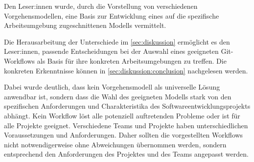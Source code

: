 Den Leser:innen wurde, durch die Vorstellung von verschiedenen Vorgehensmodellen, eine Basis zur Entwicklung eines auf die spezifische Arbeitsumgebung zugeschnittenen Modells vermittelt. 

Die Herausarbeitung der Unterschiede im \autoref{sec:diskussion} ermöglicht es den Leser:innen, passende Entscheidungen bei der Auswahl eines geeigneten Git\hyp Workflows als Basis für ihre konkreten Arbeitsumgebungen zu treffen. Die konkreten Erkenntnisse können in \autoref{sec:diskussion:conclusion} nachgelesen werden.

Dabei wurde deutlich, dass kein Vorgehensmodell als universelle Lösung anwendbar ist, sondern dass die Wahl des geeigneten Modells stark von den spezifischen Anforderungen und Charakteristika des Softwareentwicklungsprojekts abhängt. Kein Workflow löst alle potenziell auftretenden Probleme oder ist für alle Projekte geeignet. Verschiedene Teams und Projekte haben unterschiedlichen Voraussetzungen und Anforderungen. Daher sollten die vorgestellten Workflows nicht notwendigerweise ohne Abweichungen übernommen werden, sondern entsprechend den Anforderungen des Projektes und des Teams angepasst werden.
